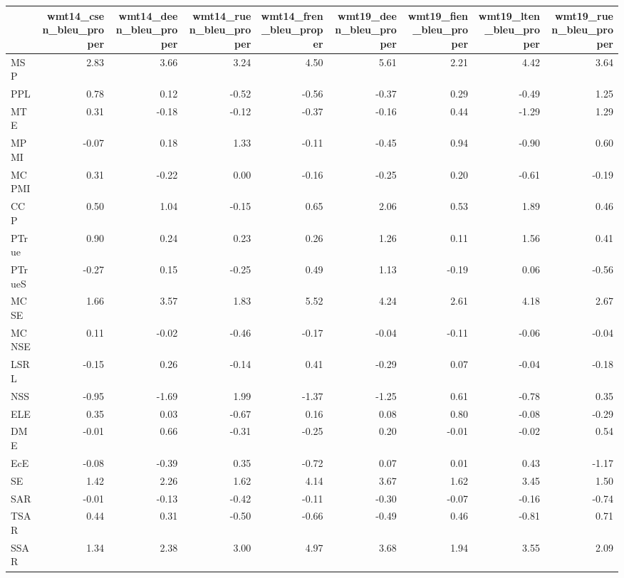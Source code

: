 \begin{tabular}{lrrrrrrrr}
\toprule
 & wmt14\_csen\_bleu\_proper & wmt14\_deen\_bleu\_proper & wmt14\_ruen\_bleu\_proper & wmt14\_fren\_bleu\_proper & wmt19\_deen\_bleu\_proper & wmt19\_fien\_bleu\_proper & wmt19\_lten\_bleu\_proper & wmt19\_ruen\_bleu\_proper \\
\midrule
MSP & 2.83 & 3.66 & 3.24 & 4.50 & 5.61 & 2.21 & 4.42 & 3.64 \\
PPL & 0.78 & 0.12 & -0.52 & -0.56 & -0.37 & 0.29 & -0.49 & 1.25 \\
MTE & 0.31 & -0.18 & -0.12 & -0.37 & -0.16 & 0.44 & -1.29 & 1.29 \\
MPMI & -0.07 & 0.18 & 1.33 & -0.11 & -0.45 & 0.94 & -0.90 & 0.60 \\
MCPMI & 0.31 & -0.22 & 0.00 & -0.16 & -0.25 & 0.20 & -0.61 & -0.19 \\
CCP & 0.50 & 1.04 & -0.15 & 0.65 & 2.06 & 0.53 & 1.89 & 0.46 \\
PTrue & 0.90 & 0.24 & 0.23 & 0.26 & 1.26 & 0.11 & 1.56 & 0.41 \\
PTrueS & -0.27 & 0.15 & -0.25 & 0.49 & 1.13 & -0.19 & 0.06 & -0.56 \\
MCSE & 1.66 & 3.57 & 1.83 & 5.52 & 4.24 & 2.61 & 4.18 & 2.67 \\
MCNSE & 0.11 & -0.02 & -0.46 & -0.17 & -0.04 & -0.11 & -0.06 & -0.04 \\
LSRL & -0.15 & 0.26 & -0.14 & 0.41 & -0.29 & 0.07 & -0.04 & -0.18 \\
NSS & -0.95 & -1.69 & 1.99 & -1.37 & -1.25 & 0.61 & -0.78 & 0.35 \\
ELE & 0.35 & 0.03 & -0.67 & 0.16 & 0.08 & 0.80 & -0.08 & -0.29 \\
DME & -0.01 & 0.66 & -0.31 & -0.25 & 0.20 & -0.01 & -0.02 & 0.54 \\
EcE & -0.08 & -0.39 & 0.35 & -0.72 & 0.07 & 0.01 & 0.43 & -1.17 \\
SE & 1.42 & 2.26 & 1.62 & 4.14 & 3.67 & 1.62 & 3.45 & 1.50 \\
SAR & -0.01 & -0.13 & -0.42 & -0.11 & -0.30 & -0.07 & -0.16 & -0.74 \\
TSAR & 0.44 & 0.31 & -0.50 & -0.66 & -0.49 & 0.46 & -0.81 & 0.71 \\
SSAR & 1.34 & 2.38 & 3.00 & 4.97 & 3.68 & 1.94 & 3.55 & 2.09 \\
\bottomrule
\end{tabular}
